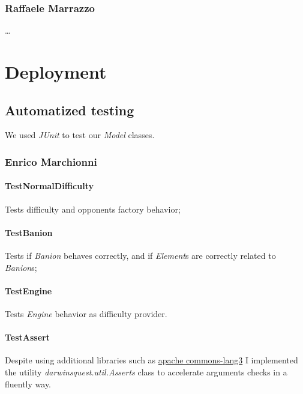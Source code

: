 \documentclass[12pt, a4paper]{report}
\theoremstyle{definition}
\begin{document}
    \subsection*{Raffaele Marrazzo}

    \dots

\chapter{Deployment}

\section{Automatized testing}

    We used \emph{JUnit} to test our \emph{Model} classes.

    \subsection*{Enrico Marchionni}

    \subsubsection{TestNormalDifficulty}
    
    Tests difficulty and opponents factory behavior;

    \subsubsection{TestBanion}
    
    Tests if \emph{Banion} behaves correctly, and if \emph{Element}s are correctly related to \emph{Banion}s;

    \subsubsection{TestEngine}
    
    Tests \emph{Engine} behavior as difficulty provider.

    \subsubsection{TestAssert}
    
    Despite using additional libraries such as \href{https://commons.apache.org/proper/commons-lang/}{apache commons-lang3}
    I implemented the utility \emph{darwinsquest.util.Asserts} class to accelerate arguments checks in a fluently way.
\end{document}
